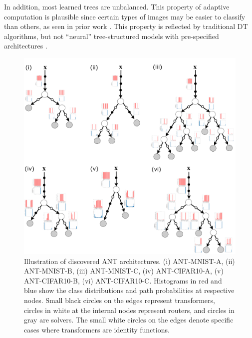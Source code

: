 In addition, most learned trees are unbalanced. This property of adaptive computation is plausible since certain types of images may be easier to classify than others, as seen in prior work \cite{Figurnov2017SpatiallyAC}. This property is reflected by traditional DT algorithms, but not ``neural'' tree-structured models with pre-specified architectures \cite{laptev2014convolutional,frosst2017distilling,kontschieder2015deep,ioannou2016decision}. 

\begin{figure}[ht]
	\center
	\includegraphics[width=0.8\linewidth]{chapter_7/figures/trees_all.pdf}
	\caption{\small Illustration of discovered ANT architectures. (i) ANT-MNIST-A, (ii) ANT-MNIST-B, (iii) ANT-MNIST-C, (iv) ANT-CIFAR10-A, (v) ANT-CIFAR10-B, (vi) ANT-CIFAR10-C. Histograms in red and blue show the class distributions and path probabilities at respective nodes. Small black circles on the edges represent transformers, circles in white at the internal nodes represent routers, and circles in gray are solvers. The small white circles on the edges denote specific cases where transformers are identity functions.}
	\label{fig:architectures}
\end{figure}




